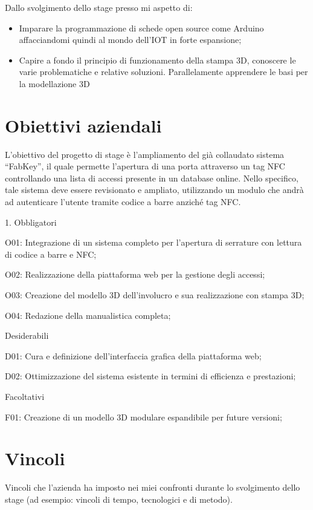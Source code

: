 Dallo svolgimento dello stage presso \lab{} mi aspetto di:
\begin{itemize}
\item Imparare la programmazione di schede open source come Arduino affacciandomi quindi al mondo dell'IOT in forte espansione;
\item Capire a fondo il principio di funzionamento della stampa 3D, conoscere le varie problematiche e relative soluzioni. Parallelamente apprendere le basi per la modellazione 3D
\end{itemize}

\section{Obiettivi aziendali}
L'obiettivo del progetto di stage è l'ampliamento del già collaudato sistema ``FabKey'', il quale permette l'apertura di una porta attraverso un tag NFC controllando una lista di accessi presente in un database online. Nello specifico, tale sistema deve essere revisionato e ampliato, utilizzando un modulo che andrà ad autenticare l'utente tramite codice a barre anziché tag NFC.

1.	Obbligatori

O01: Integrazione di un sistema completo per l'apertura di serrature con lettura di codice a barre e NFC; 

O02: Realizzazione della piattaforma web per la gestione degli accessi; 

O03: Creazione del modello 3D dell'involucro e sua realizzazione con stampa 3D; 

O04: Redazione della manualistica completa; 

Desiderabili

D01: Cura e definizione dell'interfaccia grafica della piattaforma web;

D02: Ottimizzazione del sistema esistente in termini di efficienza e prestazioni; 


Facoltativi 

F01: Creazione di un modello 3D modulare espandibile per future versioni; 


\section{Vincoli}
Vincoli che l'azienda ha imposto nei miei confronti durante lo svolgimento dello stage (ad esempio: vincoli di tempo, tecnologici e di metodo).